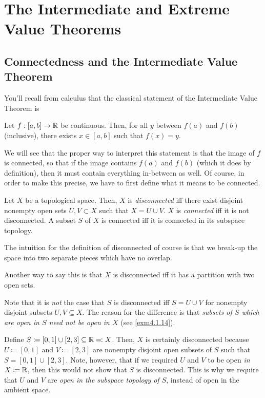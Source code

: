 \section{The Intermediate and Extreme Value Theorems}

\subsection{Connectedness and the Intermediate Value Theorem}

You'll recall from calculus that the classical statement of the Intermediate Value Theorem is
\begin{textequation}
Let $f:[a,b]\rightarrow \mathbb{R}$ be continuous.  Then, for all $y$ between $f(a)$ and $f(b)$ (inclusive), there exists $x\in [a,b]$ such that $f(x)=y$.
\end{textequation}
We will see that the proper way to interpret this statement is that the image of $f$ is connected, so that if the image contains $f(a)$ and $f(b)$ (which it does by definition), then it must contain everything in-between as well.  Of course, in order to make this precise, we have to first define what it means to be connected.
\begin{dfn}\label{Connected}
Let $X$ be a topological space.  Then, $X$ is \emph{disconnected} iff there exist disjoint nonempty open sets $U,V\subset X$ such that $X=U\cup V$.  $X$ is \emph{connected} iff it is not disconnected.  A subset $S$ of $X$ is connected iff it is connected in its subspace topology.
\begin{rmk}
The intuition for the definition of disconnected of course is that we break-up the space into two separate pieces which have no overlap.
\end{rmk}
\begin{rmk}
Another way to say this is that $X$ is disconnected iff it has a partition with two open sets.
\end{rmk}
\begin{rmk}
Note that it is \emph{not} the case that $S$ is disconnected iff $S=U\cup V$ for nonempty disjoint subsets $U,V\subseteq X$.  The reason for the difference is that \emph{subsets of $S$ which are open in $S$ need not be open in $X$} (see \cref{exm4.1.14}).
\end{rmk}
\end{dfn}
\begin{exm}
Define $S\coloneqq [0,1]\cup [2,3]\subseteq \mathbb{R} \eqqcolon X$.  Then, $X$ is certainly disconnected because $U\coloneqq [0,1]$ and $V\coloneqq [2,3]$ are nonempty disjoint open subsets of $S$ such that $S=[0,1]\cup [2,3]$.  Note, however, that if we required $U$ and $V$ to be open \emph{in $X\coloneqq \mathbb{R}$}, then this would not show that $S$ is disconnected.  This is why we require that $U$ and $V$ are \emph{open in the subspace topology of $S$}, instead of open in the ambient space.
\end{exm}
